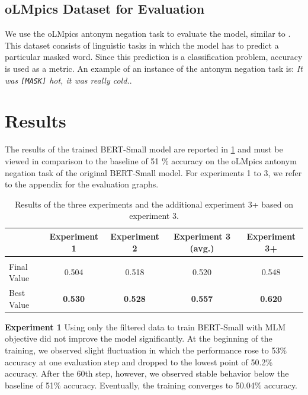 \documentclass{article}
\begin{document}
\subsection{oLMpics Dataset for Evaluation}
We use the oLMpics antonym negation task \citep{talmor-etal-2020-olmpics} to evaluate the model, similar to \cite{lialin-etal-2022-life}. This dataset consists of linguistic tasks in which the model has to predict a particular masked word. Since this prediction is a classification problem, accuracy is used as a metric.
An example of an instance of the antonym negation task is: \textit{It was \texttt{[MASK]} hot, it was really cold.}.


\section{Results}
\label{section::results}
The results of the trained BERT-Small model are reported in \ref{tab:results} and must be viewed in comparison to the baseline of 51 \% accuracy on the oLMpics antonym negation task of the original BERT-Small model. For experiments 1 to 3, we refer to the appendix for the evaluation graphs.

\begin{table}[!h]
    \centering
    \begin{tabular}{l|c|c|c|c}
        \hline
                    & Experiment 1      & Experiment 2          & Experiment 3 (avg.)   & Experiment 3+     \\ \hline
                    &                   &                       &                       &                   \\
        Final Value & 0.504             & 0.518                 & 0.520                 & 0.548             \\
        Best Value  & \textbf{0.530}    & \textbf{0.528}        & \textbf{0.557}        & \textbf{0.620}    \\ \hline
    \end{tabular}
    \caption{Results of the three experiments and the additional experiment 3+ based on experiment 3.}
    \label{tab:results}
\end{table}


\textbf{Experiment 1}
Using only the filtered data to train BERT-Small with MLM objective did not improve the model significantly. At the beginning of the training, we observed slight fluctuation in which the performance rose to 53\% accuracy at one evaluation step and dropped to the lowest point of 50.2\% accuracy. After the 60th step, however, we observed stable behavior below the baseline of 51\% accuracy. Eventually, the training converges to 50.04\% accuracy. 
\end{document}
